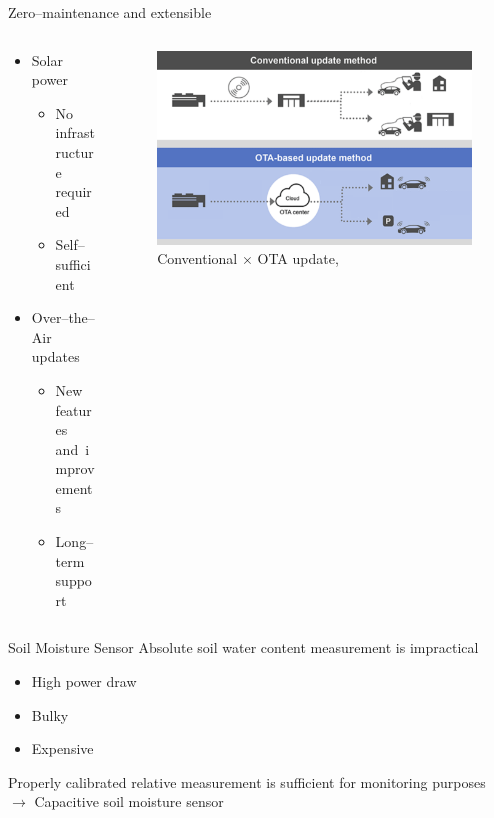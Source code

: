 \documentclass[hyphens]{beamer}
\begin{document}
\begin{frame}{Zero--maintenance and extensible}
\begin{columns}[T]
\begin{column}{.4\textwidth}
    \begin{itemize}
        \item Solar power
        \begin{itemize}
            \item No infrastructure required
            \item Self--sufficient
        \end{itemize}
        \item Over--the--Air updates
        \begin{itemize}
            \item New features and~improvements
            \item Long--term support
        \end{itemize}
    \end{itemize}
\end{column}
\hfil
\begin{column}{.6\textwidth}
    \begin{figure}
        \centering
        \includegraphics[width=\linewidth]{img/ota-popular.png}
        \caption*{Conventional $\times$ OTA update, \cite{mobility_connected_what_2024}}
    \end{figure}
\end{column}
\end{columns}
\end{frame}


\begin{frame}{Soil Moisture Sensor}
Absolute soil water content measurement is impractical
\begin{itemize}
    \item High power draw
    \item Bulky
    \item Expensive
\end{itemize}
\vspace{1em}
Properly calibrated relative measurement is sufficient for monitoring purposes\\
\vspace{1em}
$\to$ Capacitive soil moisture sensor
\end{frame}
\end{document}
